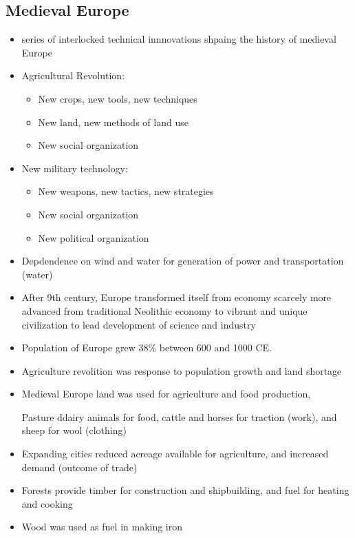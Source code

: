 \documentclass{article}
\begin{document}
\subsection{Medieval Europe}
\begin{itemize}
  \item series of interlocked technical innnovations
    shpaing the history of medieval Europe
  \item Agricultural Revolution:
    \begin{itemize}
      \item New crops, new tools, new techniques
      \item New land, new methods of land use
      \item New social organization
    \end{itemize}
  \item New military technology:
    \begin{itemize}
      \item New weapons, new tactics, new strategies
      \item New social organization
      \item New political organization
    \end{itemize}
  \item Depdendence on wind and water for generation of power and transportation (water)
  \item After 9th century, Europe transformed itself from economy scarcely more advanced
    from traditional Neolithic economy to vibrant and unique civilization to lead
    development of science and industry
  \item Population of Europe grew 38\% between 600 and 1000 CE.
  \item Agriculture revolition was response to population growth and land shortage
  \item Medieval Europe land was used for agriculture and food production,

    Pasture ddairy animals for food, cattle and horses for traction (work), and sheep for wool (clothing)
  \item Expanding cities reduced acreage available for agriculture,
    and increased demand (outcome of trade)
  \item Forests provide timber for construction and shipbuilding,
    and fuel for heating and cooking
  \item Wood was used as fuel in making iron
\end{itemize}
\end{document}
